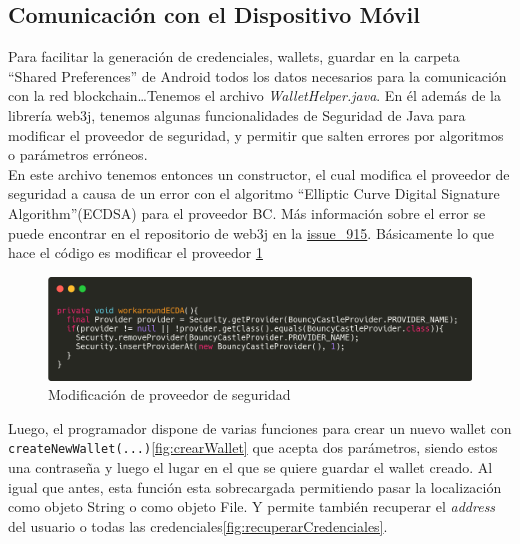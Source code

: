 \subsection{Comunicación con el Dispositivo Móvil}

Para facilitar la generación de credenciales, wallets, guardar en la carpeta ``Shared Preferences'' de Android todos los datos necesarios para la comunicación con la red blockchain\dots Tenemos el archivo \emph{WalletHelper.java}. En él además de la librería web3j, tenemos algunas funcionalidades de Seguridad de Java para modificar el proveedor de seguridad, y permitir que salten errores por algoritmos o parámetros erróneos. \\

En este archivo tenemos entonces un constructor, el cual modifica el proveedor de seguridad a causa de un error con el algoritmo ``Elliptic Curve Digital Signature Algorithm''(ECDSA)\cite{ecdsa} para el proveedor BC\cite{bc}. Más información sobre el error se puede encontrar en el repositorio de web3j en la \href{https://github.com/web3j/web3j/issues/915}{issue\_915}. Básicamente lo que hace el código es modificar el proveedor \ref{fig:ecdsa} \\


\begin{figure}[h!]
  \centering
  \includegraphics[width=0.8\linewidth]{figs/Desarrollo/SDK/ecdsa}
  \caption[Modificación de proveedor de seguridad]{Modificación de proveedor de seguridad}
  \label{fig:ecdsa}
\end{figure}

Luego, el programador dispone de varias funciones para crear un nuevo wallet con \verb|createNewWallet(...)|\ref{fig:crearWallet} que acepta dos parámetros, siendo estos una contraseña y luego el lugar en el que se quiere guardar el wallet creado. Al igual que antes, esta función esta sobrecargada permitiendo pasar la localización como objeto String o como objeto File. Y permite también recuperar el \emph{address} del usuario o todas las credenciales\ref{fig:recuperarCredenciales}.

